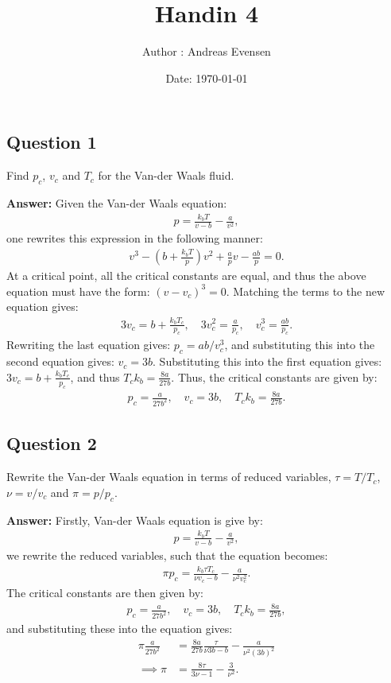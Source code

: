 \documentclass[a4paper]{article}
\title{Handin 4}
\author{Author : Andreas Evensen}
\date{Date: \today}
\newcommand{\newparagraph}{\vspace{.5cm}\noindent}
\begin{document}
\maketitle

\subsection*{Question 1}
Find $p_c$, $v_c$ and $T_c$ for the Van-der Waals fluid.

\newparagraph
\textbf{Answer: }Given the Van-der Waals equation:
\begin{align}
    p = \frac{k_bT}{v-b} - \frac{a}{v^2},\label{eq: van equation}
\end{align}one rewrites this expression in the following manner:
\begin{align*}
    v^3 -\left(b + \frac{k_bT}{p}\right)v^2 + \frac{a}{p}v -\frac{ab}{p} = 0.
\end{align*}At a critical point, all the critical constants are equal, and thus the above equation must have the form: $(v-v_c)^3 = 0$.
Matching the terms to the new equation gives:
\begin{align*}
   3v_c = b + \frac{k_bT_c}{p_c},\quad 3v_c^2 = \frac{a}{p_c},\quad v_c^3 = \frac{ab}{p_c}.
\end{align*}Rewriting the last equation gives: $p_c = ab / v_c^3$, and substituting this into the second equation gives: $v_c = 3b$.
Substituting this into the first equation gives: $3v_c = b + \frac{k_bT_c}{p_c}$, and thus $T_ck_b = \frac{8a}{27b}$.
Thus, the critical constants are given by:
\begin{align*}
    p_c = \frac{a}{27b^2}, \quad v_c = 3b, \quad T_ck_b = \frac{8a}{27b}.
\end{align*}

\subsection*{Question 2}
Rewrite the Van-der Waals equation in terms of reduced variables, $\tau = T / T_c$, $\nu = v / v_c$ and $\pi = p / p_c$.

\newparagraph
\textbf{Answer: }Firstly, Van-der Waals equation is give by:
\begin{align*}
    p = \frac{k_bT}{v-b} - \frac{a}{v^2},
\end{align*}we rewrite the reduced variables, such that the equation becomes:
\begin{align*}
    \pi p_c = \frac{k_b\tau T_c}{\nu v_c - b} - \frac{a}{\nu^2 v_c^2}.
\end{align*}The critical constants are then given by:
\begin{align*}
    p_c = \frac{a}{27b^2}, \quad v_c = 3b, \quad T_ck_b = \frac{8a}{27b},
\end{align*}and substituting these into the equation gives:
\begin{align*}
    \pi \frac{a}{27b^2} &= \frac{8a}{27b}\frac{\tau}{\nu 3b - b} - \frac{a}{\nu^2 (3b)^2}\\
    \implies \pi &= \frac{8\tau}{3\nu - 1} - \frac{3}{\nu^2}.
\end{align*}
\end{document}
